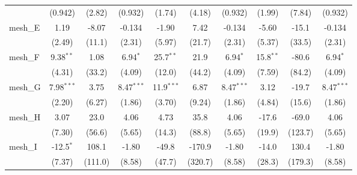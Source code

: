 \begin{tabular}{lccccccccc}
                                                               & (0.942)        & (2.82)         & (0.932)       & (1.74)         & (4.18)         & (0.932)       & (1.99)         & (7.84)         & (0.932)\\   
   mesh\_E                                                     & 1.19           & -8.07          & -0.134        & -1.90          & 7.42           & -0.134        & -5.60          & -15.1          & -0.134\\   
                                                               & (2.49)         & (11.1)         & (2.31)        & (5.97)         & (21.7)         & (2.31)        & (5.37)         & (33.5)         & (2.31)\\   
   mesh\_F                                                     & 9.38$^{**}$    & 1.08           & 6.94$^{*}$    & 25.7$^{**}$    & 21.9           & 6.94$^{*}$    & 15.8$^{**}$    & -80.6          & 6.94$^{*}$\\   
                                                               & (4.31)         & (33.2)         & (4.09)        & (12.0)         & (44.2)         & (4.09)        & (7.59)         & (84.2)         & (4.09)\\   
   mesh\_G                                                     & 7.98$^{***}$   & 3.75           & 8.47$^{***}$  & 11.9$^{***}$   & 6.87           & 8.47$^{***}$  & 3.12           & -19.7          & 8.47$^{***}$\\   
                                                               & (2.20)         & (6.27)         & (1.86)        & (3.70)         & (9.24)         & (1.86)        & (4.84)         & (15.6)         & (1.86)\\   
   mesh\_H                                                     & 3.07           & 23.0           & 4.06          & 4.73           & 35.8           & 4.06          & -17.6          & -69.0          & 4.06\\   
                                                               & (7.30)         & (56.6)         & (5.65)        & (14.3)         & (88.8)         & (5.65)        & (19.9)         & (123.7)        & (5.65)\\   
   mesh\_I                                                     & -12.5$^{*}$    & 108.1          & -1.80         & -49.8          & -170.9         & -1.80         & -14.0          & 130.4          & -1.80\\   
                                                               & (7.37)         & (111.0)        & (8.58)        & (47.7)         & (320.7)        & (8.58)        & (28.3)         & (179.3)        & (8.58)\\   

\end{tabular}
